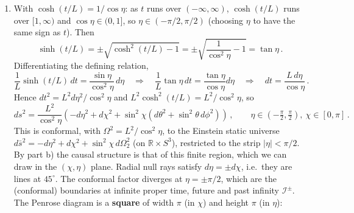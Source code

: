 \documentclass[12pt]{article}
\newcommand{\be}{\begin{equation}}
\newcommand{\ee}{\end{equation}}
\begin{document}
\begin{enumerate}[label=\alph*)]
\item With $\cosh(t/L) = 1/\cos\eta$: as $t$ runs over $(-\infty,\infty)$, $\cosh(t/L)$ runs over $[1,\infty)$ and
$\cos\eta\in(0,1]$, so $\eta\in(-\pi/2,\pi/2)$ (choosing $\eta$ to have the same sign as $t$). Then
\be
\sinh(t/L) = \pm\sqrt{\cosh^2(t/L)-1} = \pm\sqrt{\frac{1}{\cos^2\eta}-1} = \tan\eta\,.
\ee
Differentiating the defining relation,
\be
\frac{1}{L}\sinh(t/L)\, dt = \frac{\sin\eta}{\cos^2\eta}\,d\eta
\quad\Rightarrow\quad
\frac{1}{L}\tan\eta\, dt = \frac{\tan\eta}{\cos\eta}d\eta
\quad\Rightarrow\quad
dt = \frac{L\,d\eta}{\cos\eta}\,.
\ee
Hence $dt^2 = L^2 d\eta^2/\cos^2\eta$ and $L^2\cosh^2(t/L) = L^2/\cos^2\eta$, so
\be
ds^2 = \frac{L^2}{\cos^2\eta}\left( -d\eta^2 + d\chi^2 + \sin^2\chi\left(d\theta^2 + \sin^2\theta\, d\phi^2\right)\right)\,,
\qquad \eta\in\left(-\tfrac{\pi}{2},\tfrac{\pi}{2}\right),\ \chi\in[0,\pi]\,.
\ee
This is conformal, with $\Omega^2 = L^2/\cos^2\eta$, to the Einstein static universe
$d\bar s^2 = -d\eta^2 + d\chi^2 + \sin^2\chi\, d\Omega_2^2$ (on $\mathbb{R}\times S^3$), restricted to the strip
$|\eta|<\pi/2$. By part b) the causal structure is that of this finite region, which we can draw in the $(\chi,\eta)$
plane. Radial null rays satisfy $d\eta = \pm d\chi$, i.e.\ they are lines at $45^\circ$. The conformal factor diverges
at $\eta = \pm\pi/2$, which are the (conformal) boundaries at infinite proper time, future and past infinity
$\mathcal I^\pm$. The Penrose diagram is a \textbf{square} of width $\pi$ (in $\chi$) and height $\pi$ (in $\eta$):

\begin{center}
\end{center}


\end{enumerate}
\end{document}
